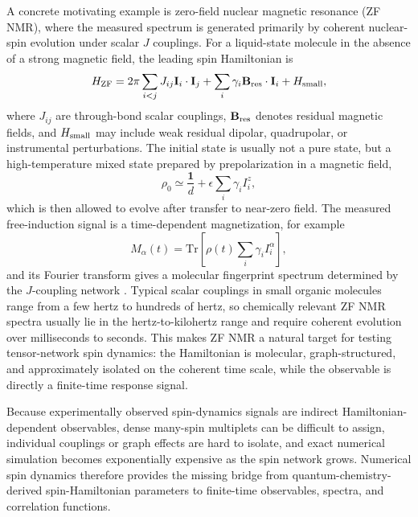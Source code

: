 \documentclass[12pt]{article}
\begin{document}
A concrete motivating example is zero-field nuclear magnetic resonance (ZF NMR), where the measured spectrum is generated primarily by coherent nuclear-spin evolution under scalar $J$ couplings.
For a liquid-state molecule in the absence of a strong magnetic field, the leading spin Hamiltonian is
\begin{equation}
H_{\rm ZF}=2\pi\sum_{i<j}J_{ij}\mathbf I_i\cdot\mathbf I_j+\sum_i \gamma_i \mathbf B_{\rm res}\cdot\mathbf I_i+H_{\rm small},
\end{equation}
where $J_{ij}$ are through-bond scalar couplings, $\mathbf B_{\rm res}$ denotes residual magnetic fields, and $H_{\rm small}$ may include weak residual dipolar, quadrupolar, or instrumental perturbations.
The initial state is usually not a pure state, but a high-temperature mixed state prepared by prepolarization in a magnetic field,
\begin{equation}
\rho_0\simeq \frac{\mathbf 1}{d}+\epsilon\sum_i\gamma_i I_i^z,
\end{equation}
which is then allowed to evolve after transfer to near-zero field.
The measured free-induction signal is a time-dependent magnetization, for example
\begin{equation}
M_\alpha(t)=\mathrm{Tr}\!\left[\rho(t)\sum_i\gamma_i I_i^\alpha\right],
\end{equation}
and its Fourier transform gives a molecular fingerprint spectrum determined by the $J$-coupling network \cite{Theis2013ChemicalAnalysis,andrewsDFTassistedNaturalAbundance2026}.
Typical scalar couplings in small organic molecules range from a few hertz to hundreds of hertz, so chemically relevant ZF NMR spectra usually lie in the hertz-to-kilohertz range and require coherent evolution over milliseconds to seconds.
This makes ZF NMR a natural target for testing tensor-network spin dynamics: the Hamiltonian is molecular, graph-structured, and approximately isolated on the coherent time scale, while the observable is directly a finite-time response signal.

Because experimentally observed spin-dynamics signals are indirect Hamiltonian-dependent observables, dense many-spin multiplets can be difficult to assign, individual couplings or graph effects are hard to isolate, and exact numerical simulation becomes exponentially expensive as the spin network grows.
Numerical spin dynamics therefore provides the missing bridge from quantum-chemistry-derived spin-Hamiltonian parameters to finite-time observables, spectra, and correlation functions.
\end{document}
